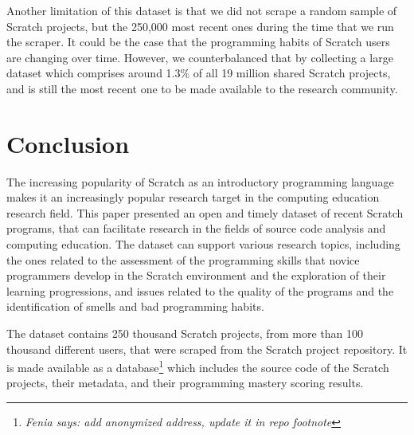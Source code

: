 \documentclass[10pt, conference]{IEEEtran}
\newcommand{\fenia}[1]{\emph{\color{blue}Fenia says: #1}}
\begin{document}
Another limitation of this dataset is that we did not scrape a random sample of Scratch projects, but the 250,000 most recent ones during the time that we run the scraper.
It could be the case that the programming habits of Scratch users are changing over time.
However, we counterbalanced that by collecting a large dataset which comprises around 1.3\% of all 19 million shared Scratch projects, and is still the most recent one to be made available to the research community.

\section{Conclusion}
The increasing popularity of Scratch as an introductory programming language makes it an increasingly popular research target in the computing education research field.
This paper presented an open and timely dataset of recent Scratch programs, that can facilitate research in the fields of source code analysis and computing education.
The dataset can support various research topics, including the ones related to the assessment of the programming skills that novice programmers develop in the Scratch environment and the exploration of their learning progressions, and issues related to the quality of the programs and the identification of smells and bad programming habits.

The dataset contains 250 thousand Scratch projects, from more than 100 thousand different users, that were scraped from the Scratch project repository.
It is made available as a database\footnote{{\fenia{add anonymized address, update it in repo footnote}}} which includes the source code of the Scratch projects, their metadata, and their programming mastery scoring results.



\end{document}
